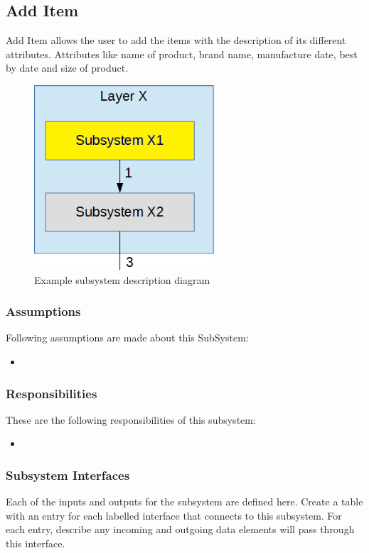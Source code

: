 \subsection{Add Item}
Add Item allows the user to add the items with the description of its different attributes. Attributes like name of product, brand name, manufacture date, best by date and size of product.


\begin{figure}[h!]
	\centering
 	\includegraphics[width=0.60\textwidth]{images/subsystem}
 \caption{Example subsystem description diagram}
\end{figure}

\subsubsection{Assumptions}
Following assumptions are made about this SubSystem:
\begin{itemize}
    \item 
\end{itemize}

\subsubsection{Responsibilities}
These are the following responsibilities of this subsystem:
\begin{itemize}
    \item 
\end{itemize}

\subsubsection{Subsystem Interfaces}
Each of the inputs and outputs for the subsystem are defined here. Create a table with an entry for each labelled interface that connects to this subsystem. For each entry, describe any incoming and outgoing data elements will pass through this interface.

